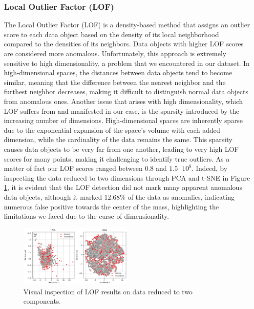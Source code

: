 \documentclass[9pt,twocolumn]{article}
\begin{document}
\subsubsection{Local Outlier Factor (LOF)}
The Local Outlier Factor (LOF) is a density-based method that assigns an outlier score to each data object based on the density of its local neighborhood compared to the densities of its neighbors. Data objects with higher LOF scores are considered more anomalous. Unfortunately, this approach is extremely sensitive to high dimensionality, a problem that we encountered in our dataset. In high-dimensional spaces, the distances between data objects tend to become similar, meaning that the difference between the nearest neighbor and the furthest neighbor decreases, making it difficult to distinguish normal data objects from anomalous ones. Another issue that arises with high dimensionality, which LOF suffers from and manifested in our case, is the sparsity introduced by the increasing number of dimensions. High-dimensional spaces are inherently sparse due to the exponential expansion of the space's volume with each added dimension, while the cardinality of the data remains the same. This sparsity causes data objects to be very far from one another, leading to very high LOF scores for many points, making it challenging to identify true outliers. As a matter of fact our LOF scores ranged between $0.8$ and $1.5\cdot 10^8$.
Indeed, by inspecting the data reduced to two dimensions through PCA and t-SNE in Figure \ref{fig:lof_pcatsne}, it is evident that the LOF detection did not mark many apparent anomalous data objects, although it marked 12.68\% of the data as anomalies, indicating numerous false positive towards the center of the mass, highlighting the limitations we faced due to the curse of dimensionality.

 \begin{figure}[h]
    \centering
    \includegraphics[width=0.5\textwidth]{images/LOF_PCATSNE.png}
    \caption{Visual inspection of LOF results on data reduced to two components.}
    \label{fig:lof_pcatsne}
 \end{figure}
\end{document}
